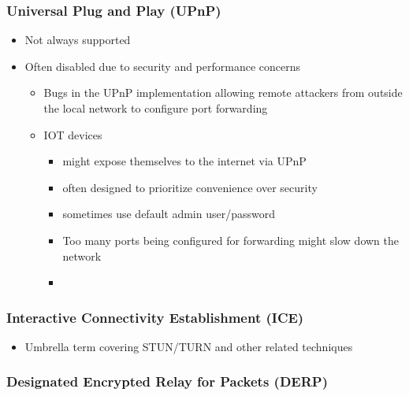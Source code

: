 \hypertarget{notes__02021-internet-protocol.md__universal-plug-and-play-upnp}{%
\subsubsection{Universal Plug and Play
(UPnP)}\label{notes__02021-internet-protocol.md__universal-plug-and-play-upnp}}

\begin{itemize}
\tightlist
\item
  Not always supported
\item
  Often disabled due to security and performance concerns

  \begin{itemize}
  \tightlist
  \item
    Bugs in the UPnP implementation allowing remote attackers from
    outside the local network to configure port forwarding
  \item
    IOT devices

    \begin{itemize}
    \tightlist
    \item
      might expose themselves to the internet via UPnP
    \item
      often designed to prioritize convenience over security
    \item
      sometimes use default admin user/password
    \item
      Too many ports being configured for forwarding might slow down the
      network
    \item
    \end{itemize}
  \end{itemize}
\end{itemize}

\hypertarget{notes__02021-internet-protocol.md__interactive-connectivity-establishment-ice}{%
\subsubsection{Interactive Connectivity Establishment
(ICE)}\label{notes__02021-internet-protocol.md__interactive-connectivity-establishment-ice}}

\begin{itemize}
\tightlist
\item
  Umbrella term covering STUN/TURN and other related techniques
\end{itemize}

\hypertarget{notes__02021-internet-protocol.md__designated-encrypted-relay-for-packets-derp}{%
\subsubsection{Designated Encrypted Relay for Packets
(DERP)}\label{notes__02021-internet-protocol.md__designated-encrypted-relay-for-packets-derp}}

